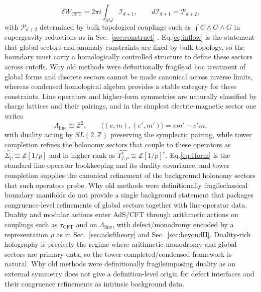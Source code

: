 \documentclass[11pt]{article}
\theoremstyle{remark}
\newcommand{\Z}{\mathbb{Z}}
\begin{document}
\begin{equation}\label{eq:inflow}
\delta W_{\mathrm{CFT}}=2\pi i \int_{\partial M}\mathcal{I}_{d+1},\qquad d\mathcal{I}_{d+1}=\mathcal{P}_{d+2},
\end{equation}
with \(\mathcal{P}_{d+2}\) determined by bulk topological couplings such as \(\int C\wedge G\wedge G\) in supergravity reductions as in Sec.~\ref{sec:construct} \cite{Schwarz1995}. Eq.\eqref{eq:inflow} is the statement that global sectors and anomaly constraints are fixed by bulk topology, so the boundary must carry a homologically controlled structure to define these sectors across cutoffs. Why old methods were definitionally fragile\:ad hoc treatment of global forms and discrete sectors cannot be made canonical across inverse limits, whereas condensed homological algebra provides a stable category for these constraints. Line operators and higher-form symmetries are naturally classified by charge lattices and their pairings, and in the simplest electric-magnetic sector one writes
\begin{equation}\label{eq:1form}
\Lambda_{\mathrm{line}}\cong \Z^{2},\qquad \langle (e,m),(e',m')\rangle = em'-e'm,
\end{equation}
with duality acting by \(SL(2,\Z)\) preserving the symplectic pairing, while tower completion refines the holonomy sectors that couple to these operators as \(\widehat{\Sigma_{p}}\cong \Z[1/p]\) and in higher rank as \(\widehat{T^{r}_{f,p}}\cong \Z[1/p]^{r}\). Eq.\eqref{eq:1form} is the standard line-operator bookkeeping and its duality covariance, and tower completion supplies the canonical refinement of the background holonomy sectors that such operators probe. Why old methods were definitionally fragile\:classical boundary manifolds do not provide a single background statement that packages congruence-level refinements of global sectors together with line-operator data. Duality and modular actions enter AdS/CFT through arithmetic actions on couplings such as \(\tau_{\mathrm{CFT}}\) and on \(\Lambda_{\mathrm{line}}\), with defect/monodromy encoded by a representation \(\rho\) as in Sec.~\ref{sec:adsftheory} and Sec.~\ref{sec:beyondII}. Duality-rich holography is precisely the regime where arithmetic monodromy and global sectors are primary data, so the tower-completed/condensed framework is natural. Why old methods were definitionally fragile\:imposing duality as an external symmetry does not give a definition-level origin for defect interfaces and their congruence refinements as intrinsic background data.
\end{document}
